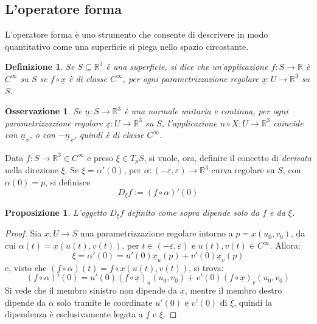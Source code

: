 \documentclass[12pt]{scrartcl}
\theoremstyle{style}
\newtheorem{definizione}{Definizione}[section]
\newtheorem{prop}{Proposizione}[section]
\newtheorem{osservazione}{Osservazione}[section]
\numberwithin{equation}{subsection}
\begin{document}
\subsection{L'operatore forma}
L’operatore forma è uno strumento che consente di descrivere in modo quantitativo come una superficie si piega nello spazio circostante.
\begin{definizione}
	Se $S \subseteq \mathbb{R}^3$ \`e una superficie, si dice che un'applicazione $f : S \to \mathbb{R}$ \`e $C^\infty$ su $S$ se $f\circ \underline{x}$ \`e di classe $C^\infty$, per ogni parametrizzazione regolare $\underline{x} : U \to \mathbb{R}^3$ su $S$.
\end{definizione}
\begin{osservazione}
Se $\underline{n} : S \to \mathbb{R}^3$ \`e una normale unitaria e continua, per ogni parametrizzazione regolare $\underline{x}:U\to \mathbb{R}^3$ su $S$, l'applicazione $n \circ X:U\to \mathbb{R}^3$ coincide con $\underline{n}_{\underline{x}} $, o con $- \underline{n}_{\underline{x}} $, quindi \`e di classe $C^\infty$.
\end{osservazione}
\noindent Data $f : S \to \mathbb{R}^3 \in C^\infty$ e preso $\xi  \in T_p S$, si vuole, ora, definire il concetto di \textit{derivata} nella direzione $\xi $.
Se $\xi = \alpha '(0)$, per $\alpha  : (-\varepsilon ,\varepsilon ) \to \mathbb{R}^3$ curva regolare su $S$, con $\alpha (0)= p$, si definisce
\begin{equation}
	D_\xi f  := (f\circ \alpha )'(0)
\end{equation}
\begin{prop}
	L'oggetto $D_\xi f$ definito come sopra dipende solo da $f$ e da $\xi $.
\end{prop}
\begin{proof}
	Sia $\underline{x} : U \to S$ una parametrizzazione regolare intorno a $p = \underline{x}(u_0,v_0)$, da cui $\alpha  (t) = \underline{x}(u(t),v(t))$, per $t \in  (-\varepsilon ,\varepsilon )$ e $u(t),v(t) \in C^\infty$.
	Allora:
	\[
	\xi  = \alpha '(0) = u'(0) \underline{x}_u(p) + v'(0) \underline{x}_v(p)
	\] 
	e, visto che $(f\circ \alpha ) (t) = f\circ \underline{x}(u(t),v(t))$, si trova:
	\begin{equation}\label{star}
		(f\circ \alpha )' (0) = u'(0) (f\circ \underline{x})_u (u_0,v_0) + v'(0) (f\circ \underline{x})_v (u_0,v_0)
\end{equation}	
Si vede che il membro sinistro non dipende da $\underline{x}$, mentre il membro destro dipende da $\alpha $ solo tramite le coordinate $u'(0)$ e $v'(0)$ di $\xi $, quindi la dipendenza \`e esclusivamente legata a $f$ e $\xi $.
\end{proof}
\end{document}

